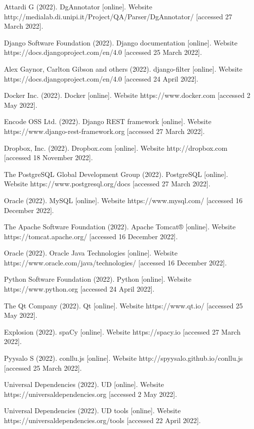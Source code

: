 \begin{thebibliography}{99}
 Attardi G (2022). {DgAnnotator} [online]. Website http://medialab.di.unipi.it/Project/QA/Parser/DgAnnotator/ [accessed 27 March 2022].

 Django Software Foundation (2022). Django documentation [online]. Website https://docs.djangoproject.com/en/4.0 [accessed 25 March 2022].

 Alex Gaynor, Carlton Gibson and others (2022). django-filter [online]. Website https://docs.djangoproject.com/en/4.0 [accessed 24 April 2022].

 Docker Inc. (2022). Docker [online]. Website https://www.docker.com [accessed 2 May 2022].

 Encode OSS Ltd. (2022). Django REST framework [online]. Website https://www.django-rest-framework.org [accessed 27 March 2022].

 Dropbox, Inc. (2022). Dropbox.com [online]. Website http://dropbox.com [accessed 18 November 2022].

 The PostgreSQL Global Development Group (2022). PostgreSQL [online]. Website https://www.postgresql.org/docs [accessed 27 March 2022].

 Oracle (2022). MySQL [online]. Website https://www.mysql.com/ [accessed 16 December 2022].

 The Apache Software Foundation (2022). Apache Tomcat® [online]. Website https://tomcat.apache.org/ [accessed 16 December 2022].

 Oracle (2022). Oracle Java Technologies [online]. Website https://www.oracle.com/java/technologies/ [accessed 16 December 2022].

 Python Software Foundation (2022). Python [online]. Website https://www.python.org [accessed 24 April 2022].

 The Qt Company (2022). Qt [online]. Website https://www.qt.io/ [accessed 25 May 2022].

 Explosion (2022). spaCy [online]. Website https://spacy.io [accessed 27 March 2022].

 Pyysalo S (2022). conllu.js [online]. Website http://spyysalo.github.io/conllu.js [accessed 25 March 2022].

 Universal Dependencies (2022). UD [online]. Website https://universaldependencies.org [accessed 2 May 2022].

 Universal Dependencies (2022). UD tools [online]. Website https://universaldependencies.org/tools [accessed 22 April 2022].


\end{thebibliography}
